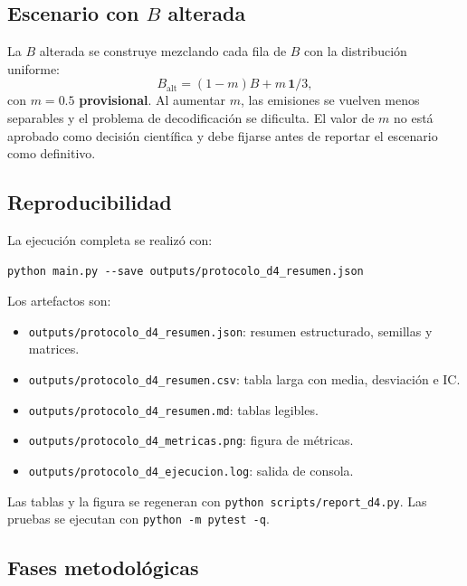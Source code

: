 \documentclass[11pt,a4paper]{article}
\begin{document}
\subsection{Escenario con \(B\) alterada}

La \(B\) alterada se construye mezclando cada fila de \(B\) con la distribución uniforme:
\begin{equation}
B_{\text{alt}}=(1-m)B+m\,\mathbf{1}/3,
\end{equation}
con \(m=0.5\) \textbf{provisional}. Al aumentar \(m\), las emisiones se vuelven menos separables y el problema de decodificación se dificulta. El valor de \(m\) no está aprobado como decisión científica y debe fijarse antes de reportar el escenario como definitivo.

\subsection{Reproducibilidad}

La ejecución completa se realizó con:
\begin{verbatim}
python main.py --save outputs/protocolo_d4_resumen.json
\end{verbatim}

Los artefactos son:
\begin{itemize}
  \item \texttt{outputs/protocolo\_d4\_resumen.json}: resumen estructurado, semillas y matrices.
  \item \texttt{outputs/protocolo\_d4\_resumen.csv}: tabla larga con media, desviación e IC.
  \item \texttt{outputs/protocolo\_d4\_resumen.md}: tablas legibles.
  \item \texttt{outputs/protocolo\_d4\_metricas.png}: figura de métricas.
  \item \texttt{outputs/protocolo\_d4\_ejecucion.log}: salida de consola.
\end{itemize}

Las tablas y la figura se regeneran con \texttt{python scripts/report\_d4.py}. Las pruebas se ejecutan con \texttt{python -m pytest -q}.

\subsection{Fases metodológicas}
\end{document}

